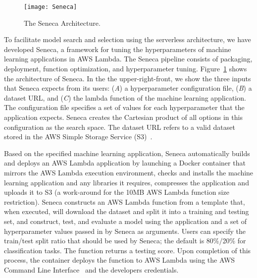 \begin{figure}[t] \centering 
\texttt{[image: Seneca]}
\caption{The Seneca Architecture.
\label{fig:seneca}}
\vspace{-0.2in}
\end{figure}

To facilitate model search and selection using the serverless
architecture, we have developed Seneca, a framework for tuning the
hyperparameters of machine learning applications in AWS Lambda.  The
Seneca pipeline consists of packaging, deployment, function
optimization, and hyperparameter tuning. Figure~\ref{fig:seneca} shows
the architecture of Seneca.  In the the upper-right-front, we show the
three inputs that Seneca expects from its users: (\textit{A}) a
hyperparameter configuration file, (\textit{B}) a dataset URL, and
(\textit{C}) the lambda function of the machine learning
application. The configuration file specifies a set of values for
each hyperparameter that the application expects. Seneca creates the
Cartesian product of all options in this configuration as
the search space. The dataset URL refers to a valid dataset stored in
the AWS Simple Storage Service (S3)~\cite{ref:awss3}.

Based on the specified machine learning application, Seneca
automatically builds and deploys an AWS Lambda application by
launching a Docker container that mirrors the AWS Lambda execution
environment, checks and installs the machine learning application and
any libraries it requires, compresses the application and uploads it
to S3 (a
work-around for the 10MB AWS Lambda function size restriction).
Seneca constructs an AWS Lambda function from a template that, when
executed, will download the dataset and split it into a training and
testing set, and construct, test, and evaluate a model using the
application and a set of hyperparameter values passed in by Seneca as
arguments.  Users can specify the train/test split ratio that should
be used by Seneca; the default is 80\%/20\% for classification tasks.  The function returns a
testing score.  Upon completion of this process, the container deploys
the function to AWS Lambda using the AWS Command Line
Interface~\cite{ref:awscli}
and the developers credentials.



